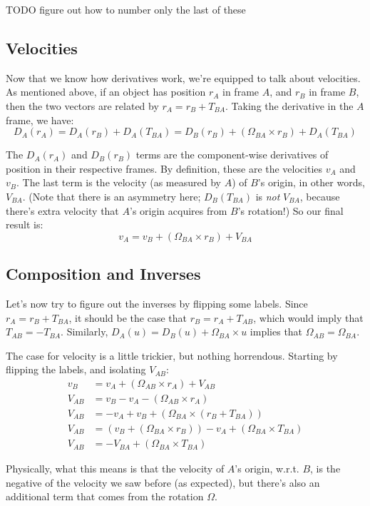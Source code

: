 \documentclass{article}
\numberwithin{equation}{subsection}
\begin{document}
TODO figure out how to number only the last of these

\subsection{Velocities}

Now that we know how derivatives work, we're equipped to talk about velocities. As mentioned above, if an object has position $r_A$ in frame $A$, and $r_B$ in frame $B$, then the two vectors are related by $r_A = r_B + T_{BA}$. Taking the derivative in the $A$ frame, we have:
\[ D_A (r_A) = D_A (r_B) + D_A(T_{BA}) = D_B (r_B) + (\Omega_{BA} \times r_B) + D_A (T_{BA}) \]

The $D_A (r_A)$ and $D_B (r_B)$ terms are the component-wise derivatives of position in their respective frames. By definition, these are the velocities $v_A$ and $v_B$. The last term is the velocity (as measured by $A$) of $B$'s origin, in other words, $V_{BA}$. (Note that there is an asymmetry here; $D_B (T_{BA})$ is \textit{not} $V_{BA}$, because there's extra velocity that $A$'s origin acquires from $B$'s rotation!) So our final result is:
\[ v_A = v_B + (\Omega_{BA} \times r_B) + V_{BA} \]

\subsection{Composition and Inverses}

Let's now try to figure out the inverses by flipping some labels. Since $r_A = r_B + T_{BA}$, it should be the case that $r_B = r_A + T_{AB}$, which would imply that $T_{AB} = -T_{BA}$. Similarly, $D_A(u) = D_B(u) + \Omega_{BA} \times u$ implies that $\Omega_{AB} = \Omega_{BA}$.

The case for velocity is a little trickier, but nothing horrendous. Starting by flipping the labels, and isolating $V_{AB}$:
\begin{align*}
v_B &= v_A + (\Omega_{AB} \times r_A) + V_{AB} \\
V_{AB} &= v_B - v_A - (\Omega_{AB} \times r_A) \\
V_{AB} &= -v_A + v_B + (\Omega_{BA} \times (r_B + T_{BA})) \\
V_{AB} &= (v_B + (\Omega_{BA} \times r_B)) - v_A + (\Omega_{BA} \times T_{BA}) \\
V_{AB} &= -V_{BA} + (\Omega_{BA} \times T_{BA})
\end{align*}

Physically, what this means is that the velocity of $A$'s origin, w.r.t. $B$, is the negative of the velocity we saw before (as expected), but there's also an additional term that comes from the rotation $\Omega$.
\end{document}
